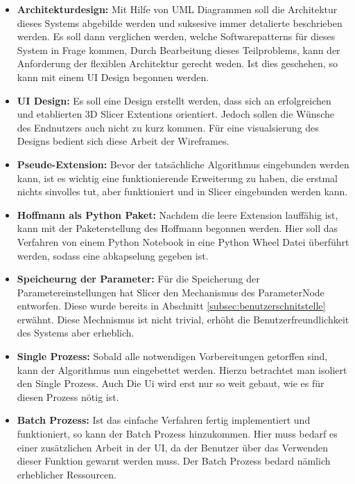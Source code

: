 \begin{itemize}
	\item \textbf{Architekturdesign:} Mit Hilfe von UML Diagrammen soll die
		Architektur dieses Systems abgebilde werden und suksesive immer detalierte
		beschrieben werden. Es soll dann verglichen werden, welche Softwarepatterns
		für dieses System in Frage kommen, Durch Bearbeitung dieses Teilproblems, kann der
        Anforderung der flexiblen Architektur gerecht weden. Ist dies geschehen, so kann mit einem UI
		Design begonnen werden.

	\item \textbf{UI Design:} Es soll eine Design erstellt werden, dass sich an erfolgreichen
		und etablierten 3D Slicer Extentions orientiert. Jedoch sollen die Wünsche
		des Endnutzers auch nicht zu kurz kommen. Für eine visualsierung des Designs
		bedient sich diese Arbeit der Wireframes.

	\item \textbf{Pseude-Extension:} Bevor der tatsächliche Algorithmus
		eingebunden werden kann, ist es wichtig eine funktionierende Erweiterung zu haben,
		die erstmal nichts sinvolles tut, aber funktioniert und in Slicer eingebunden
		werden kann.

	\item \textbf{Hoffmann als Python Paket:} Nachdem die leere Extension
		lauffähig ist, kann mit der Paketerstellung des Hoffmann begonnen werden.
		Hier soll das Verfahren von einem Python Notebook in eine Python Wheel Datei
		überführt werden, sodass eine abkapselung gegeben ist.

	\item \textbf{Speicheurng der Parameter:} Für die Speicherung der
		Parametereinstellungen hat Slicer den Mechanismus des ParameterNode
		entworfen. Diese wurde bereits in Abschnitt \ref{subsec:benutzerschnitstelle}
		erwähnt. Diese Mechnismus ist nicht trivial, erhöht die Benutzerfreundlichkeit
		des Systems aber erheblich.

	\item \textbf{Single Prozess:} Sobald alle notwendigen Vorbereitungen
		getorffen sind, kann der Algorithmus nun eingebettet werden. Hierzu
		betrachtet man isoliert den Single Prozess. Auch Die Ui wird erst nur so weit
		gebaut, wie es für diesen Prozess nötig ist.

	\item \textbf{Batch Prozess:} Ist das einfache Verfahren fertig implementiert
		und funktioniert, so kann der Batch Prozess hinzukommen. Hier muss bedarf
        es einer zusätzlichen Arbeit in der UI, da der Benutzer über das Verwenden
        dieser Funktion gewarnt werden muss. Der Batch Prozess bedard nämlich
        erheblicher Ressourcen.


\end{itemize}
